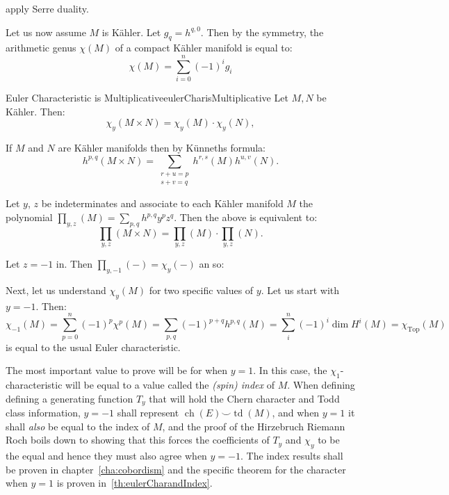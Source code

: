 \documentclass{book}
\newenvironment{Proof}[1][]
  {\begin{ProofTcb}[#1]}
  {\end{ProofTcb}}
\newcommand{\ch}{{\operatorname{ch}}}
\newcommand{\Top}{{\operatorname{Top}}}
\newcommand{\td}{{\operatorname{td}}}
\renewcommand{\ch}{{\operatorname{ch}}}
\begin{document}
\begin{Proof}
 apply Serre duality.
\end{Proof}


Let us now assume $M$ is K\"ahler. Let $g_q = h^{q,0}$. Then by the symmetry, the arithmetic genus $\chi(M)$
of a compact K\"ahler manifold is equal to:
\[
  \chi(M) = \sum_{i=0}^n (-1)^ig_i
\]
\begin{prop}{Euler Characteristic is Multiplicative}{eulerCharisMultiplicative}
  Let $M,N$ be K\"ahler. Then:
  \[
    \chi_y(M \times N) = \chi_y(M) \cdot \chi_y(N),
\]
\end{prop}

\begin{Proof}
If $M$ and $N$ are K\"ahler manifolds then by K\"unneths formula:
\[
    h^{p,q}(M \times N) = \sum_{\substack{r+u=p \\ s+v=q}} h^{r,s}(M) h^{u,v}(N).
\]

Let $y$, $z$ be indeterminates and associate to each K\"ahler manifold $M$ the polynomial $\prod_{y,z}(M)
= \sum_{p,q} h^{p,q} y^p z^q$. Then the above is equivalent to:
\[
    \prod_{y,z}(M \times N) = \prod_{y,z}(M) \cdot \prod_{y,z}(N).
\]

Let $z = -1$ in. Then $\prod_{y,-1}(-) = \chi_y(-)$ an so:

\end{Proof}
Next, let us understand $\chi_y(M)$ for two specific values of $y$. Let us start with $y = -1$. Then:
\[
  \chi_{-1}(M) = \sum_{p=0}^n (-1)^p\chi^p(M) = \sum_{p,q} (-1)^{p+q} h^{p,q}(M) = \sum_i^n (-1)^i \dim H^i(M)
  = \chi_\Top(M)
\]
is equal to the usual Euler characteristic.

The most important value to prove will be for when $y = 1$. In this case, the $\chi_{1}$-characteristic will
be equal to a value called the \emph{(spin) index} of $M$. When defining defining a generating function $T_y$ that
will hold the Chern character and Todd class information, $y = -1$ shall represent $\ch(E)\smile \td(M)$, and when $y = 1$ it shall \emph{also} be equal to the
index of $M$, and the proof of the Hirzebruch Riemann Roch boils down to showing that this forces the
coefficients of $T_y$ and $\chi_y$ to be the equal and hence they must also agree when $y = -1$. The index results
shall be proven in chapter~\ref{cha:cobordism} and the specific theorem for the character when $y=1$ is proven
in~\cref{th:eulerCharandIndex}.
\end{document}
